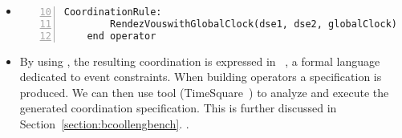 \begin{itemize}
	\item {}
	
	\begin{lstlisting}[language=bcool,
	caption={Synchronized product operator between the TFSM and Activity languages by using the library},
	label={lst:bcoolrunningexamplellib}, 
	basicstyle=\scriptsize\ttfamily, backgroundcolor=\color{LGrey}, numbers=left, firstnumber=10, xleftmargin=2pt]
	CoordinationRule: 
		RendezVouswithGlobalClock(dse1, dse2, globalClock)
	end operator
	\end{lstlisting}
	
	
	\item By using \moccml, the resulting coordination is expressed in \ccsl~\cite{tr:ccsl}, a formal language dedicated to event constraints. When building \bcool operators a \ccsl specification is produced. We can then use \ccsl tool (TimeSquare~\cite{timesquare}) to analyze and execute the generated coordination specification. This is further discussed in Section~\ref{section:bcoollengbench}. .
	
\end{itemize}